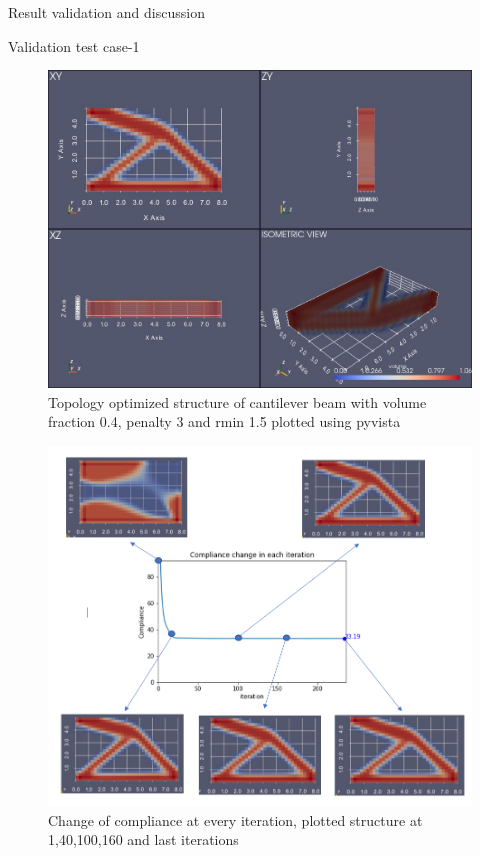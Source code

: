 \documentclass[a4paper,12pt,times]{article}
\begin{document}
\begin{section}{Result validation and discussion}
\begin{subsection}{Validation test case-1}
\begin{figure}[H]
\centering
\includegraphics[width=1\linewidth]{Numerical_result_full_OC_01.jpg}
\centering
\caption{Topology optimized structure of cantilever beam with volume fraction 0.4, penalty 3 and rmin 1.5 plotted using pyvista}
\label{VC-02.3}
\end{figure}
\begin{figure}[H]
\centering
\includegraphics[width=1\linewidth]{Compliance_chg_OC_01.png}
\centering
\caption{Change of compliance at every iteration, plotted structure at 1,40,100,160 and last iterations}


\end{figure}
\end{subsection}
\end{section}
\end{document}
